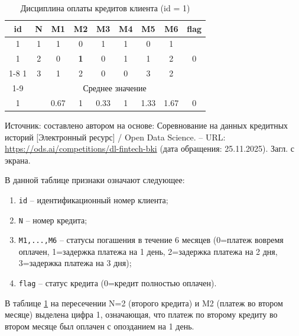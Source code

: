 \begin{center}
  \begin{longtable}{|c|c|c|c|c|c|c|c|c|}
   \caption{Дисциплина оплаты кредитов клиента (id = 1)}
    \label{table_1_1:dfgr} \\
    \hline
    \rowcolor[gray]{.9}
     id  &  N  &  M1 &  M2 & M3 & M4 & M5 & M6 & flag   \\
     \hline
     1   &  1   &  1   &  0    &  1   &  1   &  0   &  1  &\multirow{3}{*}{0}\\
     \hhline{|--------~|} %
     1   &  2   &  0   &  \cellcolor[gray]{.9}\textbf{1}  &  0   &  1   &  1   &  2  &\\
     \cline{1-8}
     1   &  3   &  1   &  2    &  0   &  0   &  3   &  2  &\\
     \cline{1-9} 
     & &\multicolumn{6}{|c|}{ Среднее значение } & \\
     \hline
     1  &   &  0.67  &  1  &  0.33  &  1  &  1.33  &  1.67  & 0 \\
     \hline
\end{longtable}
    
\begin{minipage}{\textwidth}
   \fontsize{9}{11}\selectfont
   \justifying
   Источник: составлено автором на основе: Соревнование на данных кредитных историй [Электронный ресурс] / Open Data Science. – URL: \url{https://ods.ai/competitions/dl-fintech-bki} (дата обращения: 25.11.2025). Загл. с экрана.
\end{minipage}
\end{center}
        
        В данной таблице признаки означают следующее:
\begin{enumerate}[nosep]
   \item \texttt{id} -- идентификационный номер клиента;
   \item \texttt{N} -- номер кредита;
   \item \texttt{M1,...,M6} -- статусы погашения в течение 6 месяцев (0=платеж вовремя оплачен, 1=задержка платежа на 1 день, 2=задержка платежа на 2 дня, 3=задержка платежа на 3 дня);
    \item \texttt{flag} -- статус кредита (0=кредит полностью оплачен).
\end{enumerate}
        
        В таблице \ref{table_1_1:dfgr} на пересечении N=2 (второго кредита) и M2 (платеж во втором месяце) выделена цифра 1, означающая, что платеж по второму кредиту во втором месяце был оплачен с опозданием на 1 день.
        
